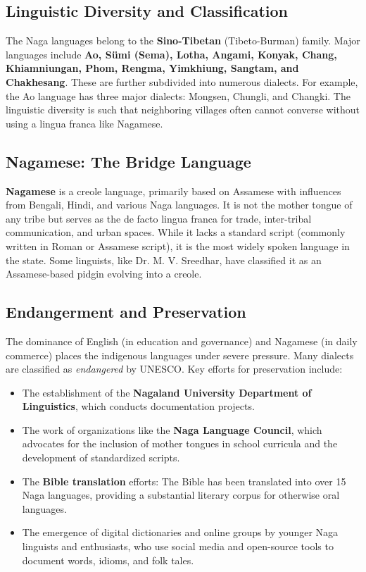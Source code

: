 \documentclass{article}
\begin{document}
\subsection{Linguistic Diversity and Classification}
The Naga languages belong to the \textbf{Sino-Tibetan} (Tibeto-Burman) family. Major languages include \textbf{Ao, Sümi (Sema), Lotha, Angami, Konyak, Chang, Khiamniungan, Phom, Rengma, Yimkhiung, Sangtam, and Chakhesang}. These are further subdivided into numerous dialects. For example, the Ao language has three major dialects: Mongsen, Chungli, and Changki. The linguistic diversity is such that neighboring villages often cannot converse without using a lingua franca like Nagamese.

\subsection{Nagamese: The Bridge Language}
\textbf{Nagamese} is a creole language, primarily based on Assamese with influences from Bengali, Hindi, and various Naga languages. It is not the mother tongue of any tribe but serves as the de facto lingua franca for trade, inter-tribal communication, and urban spaces. While it lacks a standard script (commonly written in Roman or Assamese script), it is the most widely spoken language in the state. Some linguists, like Dr. M. V. Sreedhar, have classified it as an Assamese-based pidgin evolving into a creole.

\subsection{Endangerment and Preservation}
The dominance of English (in education and governance) and Nagamese (in daily commerce) places the indigenous languages under severe pressure. Many dialects are classified as \textit{endangered} by UNESCO. Key efforts for preservation include:
\begin{itemize}
    \item The establishment of the \textbf{Nagaland University Department of Linguistics}, which conducts documentation projects.
    \item The work of organizations like the \textbf{Naga Language Council}, which advocates for the inclusion of mother tongues in school curricula and the development of standardized scripts.
    \item The \textbf{Bible translation} efforts: The Bible has been translated into over 15 Naga languages, providing a substantial literary corpus for otherwise oral languages.
    \item The emergence of digital dictionaries and online groups by younger Naga linguists and enthusiasts, who use social media and open-source tools to document words, idioms, and folk tales.
\end{itemize}
\end{document}
